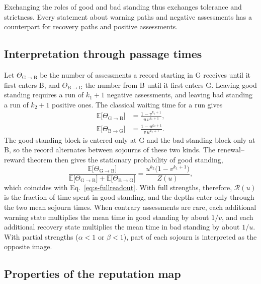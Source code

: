 \documentclass[10pt]{wlscirep}
\newcommand{\Rmap}{\mathscr{R}}            %
\theoremstyle{plain}
\theoremstyle{remark}
\begin{document}
Exchanging the roles of good and bad standing thus exchanges tolerance and strictness. Every statement about warning paths and negative assessments has a counterpart for recovery paths and positive assessments.

\subsection{Interpretation through passage times}

Let $\Theta_{\mathrm G\to\mathrm B}$ be the number of assessments a record starting in G receives until it first enters B, and $\Theta_{\mathrm B\to\mathrm G}$ the number from B until it first enters G. Leaving good standing requires a run of $k_1+1$ negative assessments, and leaving bad standing a run of $k_2+1$ positive ones. The classical waiting time for a run gives
\begin{equation}
\begin{aligned}
\mathbb E\bigl[\Theta_{\mathrm G\to\mathrm B}\bigr]&=\frac{1-v^{k_1+1}}{u\,v^{k_1+1}},\\[2pt]
\mathbb E\bigl[\Theta_{\mathrm B\to\mathrm G}\bigr]&=\frac{1-u^{k_2+1}}{v\,u^{k_2+1}}.
\end{aligned}
\label{eq:s-passage}
\end{equation}
The good-standing block is entered only at G and the bad-standing block only at B, so the record alternates between sojourns of these two kinds. The renewal--reward theorem then gives the stationary probability of good standing,
\begin{equation}
\frac{\mathbb E\bigl[\Theta_{\mathrm G\to\mathrm B}\bigr]}{\mathbb E\bigl[\Theta_{\mathrm G\to\mathrm B}\bigr]+\mathbb E\bigl[\Theta_{\mathrm B\to\mathrm G}\bigr]}
=\frac{u^{k_2}\bigl(1-v^{k_1+1}\bigr)}{Z(u)},
\label{eq:s-renewal}
\end{equation}
which coincides with Eq.~\eqref{eq:s-fullreadout}. With full strengths, therefore, $\Rmap(u)$ is the fraction of time spent in good standing, and the depths enter only through the two mean sojourn times. When contrary assessments are rare, each additional warning state multiplies the mean time in good standing by about $1/v$, and each additional recovery state multiplies the mean time in bad standing by about $1/u$. With partial strengths ($\alpha<1$ or $\beta<1$), part of each sojourn is interpreted as the opposite image.

\subsection{Properties of the reputation map}
\end{document}
